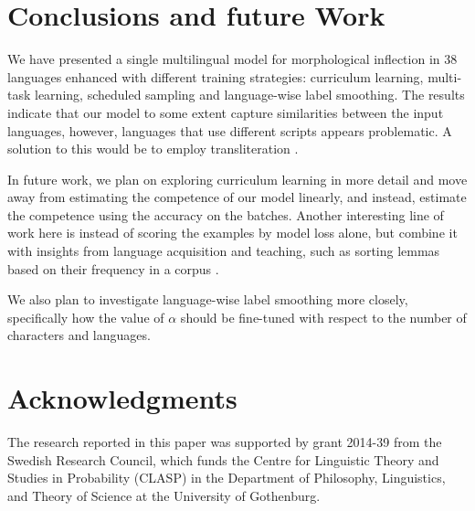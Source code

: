 \documentclass[11pt,a4paper]{article}
\begin{document}
\section{Conclusions and future Work}

We have presented a single multilingual model for morphological
inflection in $38$ languages enhanced with different training
strategies: curriculum learning, multi-task learning, scheduled
sampling and language-wise label smoothing.  The results indicate that
our model to some extent capture similarities between the input
languages, however, languages that use different scripts appears
problematic. A solution to this would be to employ transliteration
\cite{murikinati-etal-2020-transliteration}.

In future work, we plan on exploring curriculum learning in more
detail and move away from estimating the competence of our model
linearly, and instead, estimate the competence using the accuracy on
the batches. Another interesting line of work here is instead of
scoring the examples by model loss alone, but combine it with insights
from language acquisition and teaching, such as sorting lemmas based
on their frequency in a corpus \cite{ionin2002easier,
slabakova2010easy}.

We also plan to investigate language-wise label smoothing more
closely, specifically how the value of $\alpha$ should be fine-tuned
with respect to the number of characters and languages.

\section*{Acknowledgments}

The research reported in this paper was supported by grant 2014-39
from the Swedish Research Council, which funds the Centre for
Linguistic Theory and Studies in Probability (CLASP) in the Department
of Philosophy, Linguistics, and Theory of Science at the University
of Gothenburg.

 



\end{document}
